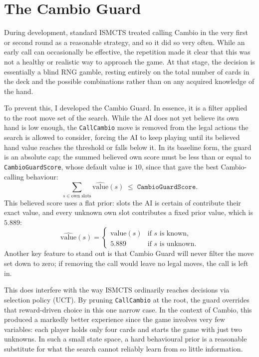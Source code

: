 \documentclass[12pt,a4paper,oneside]{report}
\begin{document}
 
\section{The Cambio Guard}
\label{sec:cambio-guard}

During development, standard ISMCTS treated calling Cambio in the very first or
second round as a reasonable strategy, and so it did so very often. While an
early call can occasionally be effective, the repetition made it clear that this
was not a healthy or realistic way to approach the game. At that stage, the
decision is essentially a blind RNG gamble, resting entirely on the total number
of cards in the deck and the possible combinations rather than on any acquired
knowledge of the hand.

To prevent this, I developed the Cambio Guard. In essence, it is a filter applied
to the root move set of the search. While the AI does not yet believe its own
hand is low enough, the \texttt{CallCambio} move is removed from the legal actions
the search is allowed to consider, forcing the AI to keep playing until its
believed hand value reaches the threshold or falls below it. In its baseline form,
the guard is an absolute cap; the summed believed own score must be less than or
equal to \texttt{CambioGuardScore}, whose default value is $10$, since that gave
the best Cambio-calling behaviour:
%
\begin{equation}
  \sum_{s \in \text{own slots}} \widehat{\text{value}}(s) \;\le\; \texttt{CambioGuardScore}.
\end{equation}
%
This believed score uses a flat prior: slots the AI is certain of contribute their
exact value, and every unknown own slot contributes a fixed prior value, which is
$5.889$:
%
\begin{equation}
  \widehat{\text{value}}(s) =
  \begin{cases}
    \text{value}(s) & \text{if $s$ is known,}\\[4pt]
    5.889           & \text{if $s$ is unknown.}
  \end{cases}
\end{equation}
%
Another key feature to stand out is that Cambio Guard will never filter the move
set down to zero; if removing the call would leave no legal moves, the call is
left in.

This does interfere with the way ISMCTS ordinarily reaches decisions via selection
policy (UCT). By pruning \texttt{CallCambio} at the root, the guard overrides that
reward-driven choice in this one narrow case. In the context of Cambio, this
produced a markedly better experience since the game involves very few variables:
each player holds only four cards and starts the game with just two unknowns. In
such a small state space, a hard behavioural prior is a reasonable substitute for
what the search cannot reliably learn from so little information.
\end{document}
